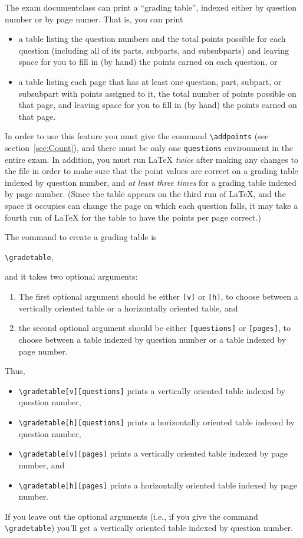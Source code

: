 \documentclass[12pt]{exam}
\begin{document}
The exam documentclass can print a ``grading table'', indexed either
by question number or by page numer.  That is, you can print
\begin{itemize}
\item a table listing the question numbers and the total points
  possible for each question (including all of its parts, subparts,
  and subsubparts) and leaving space for you to fill in (by hand) the
  points earned on each question, or
\item a table listing each page that has at least one question, part,
  subpart, or subsubpart with points assigned to it, the total number
  of points possible on that page, and leaving space for you to fill
  in (by hand) the points earned on that page.
\end{itemize}
In order to use this feature you must give the command
\verb"\addpoints" (see section~\ref{sec:Count}), and there must be
only one \verb"questions" environment in the entire exam.  In
addition, you must run \LaTeX{} \emph{twice} after making any changes
to the file in order to make sure that the point values are correct on
a grading table indexed by question number, and \emph{at least three
  times} for a grading table indexed by page number.  (Since the table
appears on the third run of \LaTeX{}, and the space it occupies can
change the page on which each question falls, it may take a fourth run
of \LaTeX{} for the table to have the points per page correct.)

\medbreak

The command to create a grading table is 
\begin{center}
  \verb"\gradetable",
\end{center}
and it takes two optional arguments:
\begin{enumerate}
\item The first optional argument should be either \verb"[v]" or
  \verb"[h]", to choose between a vertically oriented table or a
  horizontally oriented table, and
\item the second optional argument should be either \verb"[questions]"
  or \verb"[pages]", to choose between a table indexed by question
  number or a table indexed by page number.
\end{enumerate}
Thus,
\begin{itemize}
\item \verb"\gradetable[v][questions]" prints a vertically oriented
  table indexed by question number,
\item \verb"\gradetable[h][questions]" prints a horizontally oriented
  table indexed by question number,
\item \verb"\gradetable[v][pages]" prints a vertically oriented table
  indexed by page number, and
\item \verb"\gradetable[h][pages]" prints a horizontally oriented
  table indexed by page number.
\end{itemize}
If you leave out the optional arguments (i.e., if you give the command
\verb"\gradetable") you'll get a vertically oriented table indexed by
question number.
\end{document}
